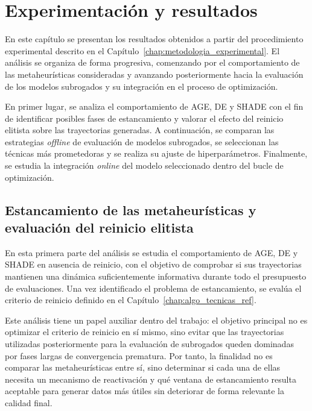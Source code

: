 \chapter{Experimentación y resultados}
\label{chap:experimentacion}


En este capítulo se presentan los resultados obtenidos a partir del procedimiento experimental descrito en el Capítulo~\ref{chap:metodologia_experimental}. El análisis se organiza de forma progresiva, comenzando por el comportamiento de las metaheurísticas consideradas y avanzando posteriormente hacia la evaluación de los modelos subrogados y su integración en el proceso de optimización.

En primer lugar, se analiza el comportamiento de AGE, DE y SHADE con el fin de identificar posibles fases de estancamiento y valorar el efecto del reinicio elitista sobre las trayectorias generadas. A continuación, se comparan las estrategias \textit{offline} de evaluación de modelos subrogados, se seleccionan las técnicas más prometedoras y se realiza su ajuste de hiperparámetros. Finalmente, se estudia la integración \textit{online} del modelo seleccionado dentro del bucle de optimización.


\section{Estancamiento de las metaheurísticas y evaluación del reinicio elitista}
\label{sec:resultados_reinicio}

En esta primera parte del análisis se estudia el comportamiento de AGE, DE y SHADE en ausencia de reinicio, con el objetivo de comprobar si sus trayectorias mantienen una dinámica suficientemente informativa durante todo el presupuesto de evaluaciones. Una vez identificado el problema de estancamiento, se evalúa el criterio de reinicio definido en el Capítulo~\ref{chap:algo_tecnicas_ref}.

Este análisis tiene un papel auxiliar dentro del trabajo: el objetivo principal no es optimizar el criterio de reinicio en sí mismo, sino evitar que las trayectorias utilizadas posteriormente para la evaluación de subrogados queden dominadas por fases largas de convergencia prematura. Por tanto, la finalidad no es comparar las metaheurísticas entre sí, sino determinar si cada una de ellas necesita un mecanismo de reactivación y qué ventana de estancamiento resulta aceptable para generar datos más útiles sin deteriorar de forma relevante la calidad final.


